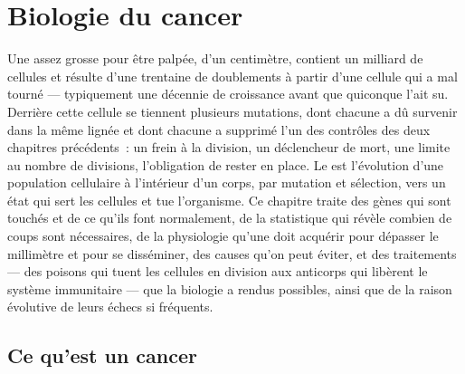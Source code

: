 \chapter{Biologie du cancer}\label{ch:b3:cancer-biology}

Une  assez grosse pour être palpée, d'un centimètre, contient un
milliard de cellules et résulte d'une trentaine de doublements à partir
d'une cellule qui a mal tourné --- typiquement une décennie de
croissance avant que quiconque l'ait su. Derrière cette cellule se
tiennent plusieurs mutations, dont chacune a dû survenir dans la même
lignée et dont chacune a supprimé l'un des contrôles des deux chapitres
précédents~: un frein à la division, un déclencheur de mort, une limite
au nombre de divisions, l'obligation de rester en place. Le  est
l'évolution d'une population cellulaire à l'intérieur d'un corps, par
mutation et sélection, vers un état qui sert les cellules et tue
l'organisme. Ce chapitre traite des gènes qui sont touchés et de ce
qu'ils font normalement, de la statistique qui révèle combien de coups
sont nécessaires, de la physiologie qu'une  doit acquérir pour
dépasser le millimètre et pour se disséminer, des causes qu'on peut
éviter, et des traitements --- des poisons qui tuent les cellules en
division aux anticorps qui libèrent le système immunitaire --- que la
biologie a rendus possibles, ainsi que de la raison évolutive de leurs
échecs si fréquents.

\section{Ce qu'est un cancer}

